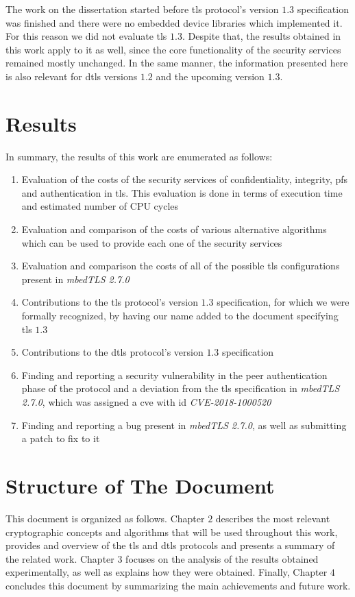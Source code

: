 The work on the dissertation started before \gls{tls} protocol's version $1.3$ specification was finished and there were no embedded device
libraries which implemented it.  For this reason we did not evaluate \gls{tls} $1.3$. Despite that, the results
obtained in this work apply to it as well, since the core functionality of the security services remained mostly unchanged.
In the same manner, the information presented here is also relevant for \gls{dtls} versions $1.2$ and the upcoming version $1.3$.

\section{Results}

In summary, the results of this work are enumerated as follows:

\begin{enumerate}
  \item Evaluation of the costs of the security services of confidentiality, integrity, \gls{pfs} and authentication in \gls{tls}. This evaluation 
  is done in terms of execution time and estimated number of CPU cycles
  \item Evaluation and comparison of the costs of various alternative algorithms which can be used to provide each one of the security services
  \item Evaluation and comparison the costs of all of the possible \gls{tls} configurations present in \textit{mbedTLS 2.7.0}
  \item Contributions to the \gls{tls} protocol's version $1.3$ specification, for which we were formally recognized, by having our name added to the document specifying \gls{tls} $1.3$\cite{RFC8446}
  \item Contributions to the \gls{dtls} protocol's version $1.3$ specification\cite{DTLS13:online}
  \item Finding and reporting a security vulnerability in the peer authentication phase of the protocol and a deviation from the \gls{tls} specification in \textit{mbedTLS 2.7.0}, which was assigned a \gls{cve} with id \textit{CVE-2018-1000520}\cite{NVDCVE2094:online}
  \item Finding and reporting a bug present in \textit{mbedTLS 2.7.0}, as well as submitting a patch to fix to it \cite{sslserve89:onelin}\cite{updatete23:online}
\end{enumerate}

\section{Structure of The Document}

This document is organized as follows. Chapter $2$ describes the most relevant cryptographic concepts and algorithms
that will be used throughout this work, provides and overview of the \gls{tls} and \gls{dtls} protocols 
and presents a summary of the related work. Chapter $3$ focuses on the analysis of the results obtained experimentally,
as well as explains how they were obtained. Finally, Chapter $4$ concludes this document by summarizing the main achievements
and future work.
